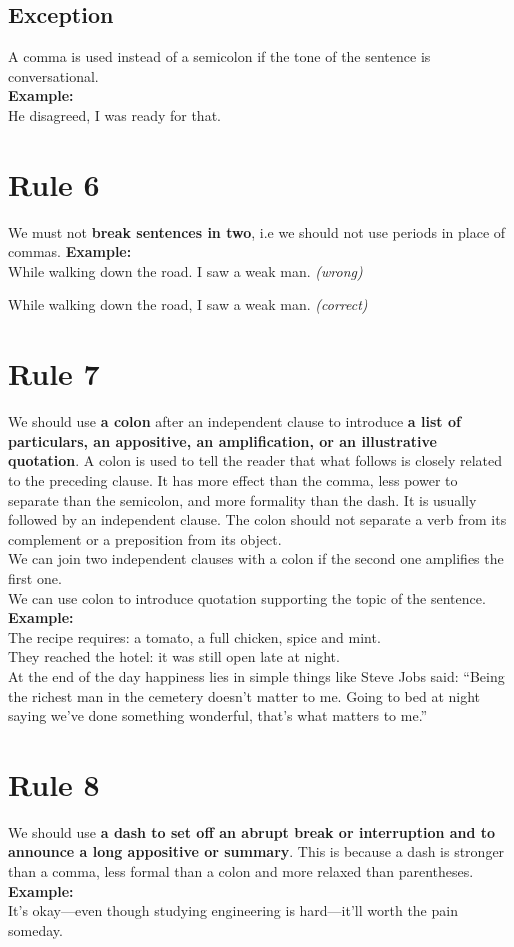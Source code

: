 \documentclass[12pt]{report}
\begin{document}
\subsection{Exception}
A comma is used instead of a semicolon if the tone of the sentence is conversational.\\ \textbf{Example:}\\
He disagreed, I was ready for that.


\section{Rule 6}
We must not \textbf{break sentences in two}, i.e we should not use periods in place of commas.
\textbf{Example:}\\
While walking down the road. I saw a weak man. \textit{(wrong)}

While walking down the road, I saw a weak man. \textit{(correct)}


\section{Rule 7}
We should use \textbf{a colon} after an independent clause to introduce \textbf{ a list of particulars, an appositive, an amplification, or an illustrative quotation}. A colon is used to tell the reader that what follows is closely related to the preceding clause. It has more effect than the comma, less power to separate than the semicolon, and more formality than the dash. It is usually followed by an independent clause. The colon should not separate a verb from its complement or a preposition from its object.\\
We can join two independent clauses with a colon if the second one amplifies the first one.\\
We can use colon to introduce quotation supporting the topic of the sentence.
\textbf{Example:}\\
The recipe requires: a tomato, a full chicken, spice and mint.\\
They reached the hotel: it was still open late at night.\\
At the end of the day happiness lies in simple things like Steve Jobs said: ``Being the richest man in the cemetery doesn't matter to me. Going to bed at night saying we've done something wonderful, that's what matters to me.''


\section{Rule 8}
We should use \textbf{a dash to set off an abrupt break or interruption and to announce a long appositive or summary}. This is because a dash is stronger than a comma, less formal than a colon and more relaxed than parentheses.\\
\textbf{Example:}\\
It's okay---even though studying engineering is hard---it'll worth the pain someday.
\end{document}
